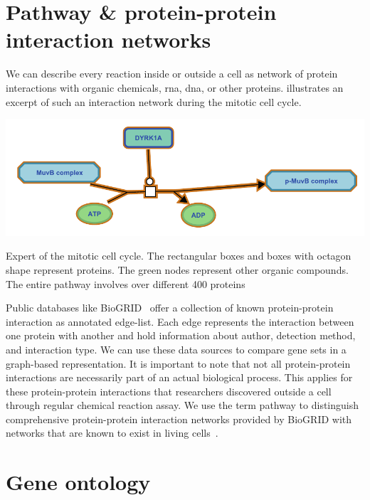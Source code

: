 \documentclass{thesisclass}
\begin{document}
\section{Pathway \& protein-protein interaction networks}

We can describe every reaction inside or outside a cell as network of protein interactions with organic chemicals, \acrshort{rna}, \acrshort{dna}, or other proteins.  illustrates an excerpt of such an interaction network during the mitotic cell cycle.

\begin{centeredFigure}[!h]
	\includegraphics[scale=0.8]{figures/introduction/pathway.pdf}
	\caption[Expert of the mitotic cell cycle.]{Expert of the mitotic cell cycle.  The rectangular boxes and boxes with octagon shape represent proteins. The green nodes represent other organic compounds. The entire pathway involves over different 400 proteins}
	\label{fig:pathway}
\end{centeredFigure}

Public databases like BioGRID~\cite{doi:10.1093/nar/gkw1102} offer a collection of known protein-protein interaction as annotated edge-list. Each edge represents the interaction between one protein with another and hold information about author, detection method, and interaction type. We can use these data sources to compare gene sets in a graph-based representation. It is important to note that not all protein-protein interactions are necessarily part of an actual biological process. This applies for these  protein-protein interactions that researchers discovered outside a cell through regular chemical reaction assay. We use the term pathway to distinguish comprehensive protein-protein interaction networks provided by BioGRID with networks that are known to exist in living cells~\cite{doi:10.1093/nar/gkw1102}.

\section{Gene ontology}
\end{document}
